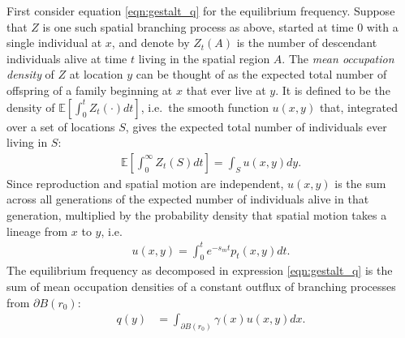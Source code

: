 \documentclass{article}
\newcommand{\E}{\mathbb{E}}
\begin{document}
First consider equation \eqref{eqn:gestalt_q} for the equilibrium frequency.
Suppose that $Z$ is one such spatial branching process as above, started at time 0 with a single individual at $x$,
and denote by $Z_t(A)$ is the number of descendant individuals alive at time $t$ living in the spatial region $A$.
The \emph{mean occupation density} of $Z$ at location $y$
can be thought of 
as the expected total number of offspring of a family beginning at $x$ that ever live at $y$.
It is defined to be the density of $\E[\int_0^t Z_t(\cdot) dt]$,
i.e.\ the smooth function $u(x,y)$ that, integrated over a set of locations $S$, 
gives the expected total number of individuals ever living in $S$:
\begin{align} \label{eqn:occupation_density_defn}
    \E\left[ \int_0^\infty Z_t(S) dt \right] = \int_S u(x,y) dy .
\end{align}
Since reproduction and spatial motion are independent,
$u(x,y)$ is the sum across all generations of the expected number of individuals alive in that generation,
multiplied by the probability density that spatial motion takes a lineage from $x$ to $y$,
i.e.\
\begin{align}
    u(x,y) = \int_0^t e^{-s_m t} p_t(x,y) dt .
\end{align}
The equilibrium frequency as decomposed in expression \eqref{eqn:gestalt_q} 
is the sum of mean occupation densities of a constant outflux of branching processes
from $\partial B(r_0)$:
\begin{align} \label{eqn:occupation_integral}
    q(y) &= \int_{\partial B(r_0)} \gamma(x) u(x,y) dx  . %
\end{align}
\end{document}
